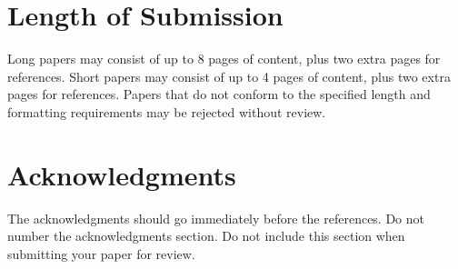 \documentclass[11pt]{article}
\begin{document}
\section{Length of Submission}
\label{sec:length}

Long papers may consist of up to 8 pages of content, plus two extra
pages for references. Short papers may consist of up to 4 pages of
content, plus two extra pages for references.  Papers that do not
conform to the specified length and formatting requirements may be
rejected without review.



\section*{Acknowledgments}

The acknowledgments should go immediately before the references.  Do
not number the acknowledgments section. Do not include this section
when submitting your paper for review.

\nocite{*}








\end{document}
